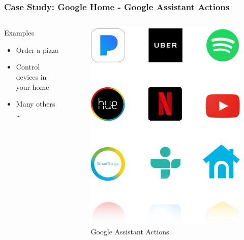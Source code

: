\documentclass{beamer}
\begin{document}
\begin{frame}
\frametitle{Case Study: Google Home - Google Assistant Actions}

\begin{columns}
	\begin{block}{Examples}
			\begin{itemize}
			\item Order a pizza
			\item Control devices in your home
			\item Many others \dots
		\end{itemize}
	\end{block}

	\begin{figure}
		\centering
		\includegraphics[width=0.7\linewidth]{images/logo-grid}
		\caption[Actions]{Google Assistant Actions}
		\label{fig:logo-grid}
	\end{figure}
	
\end{columns}

\end{frame}
\end{document}
